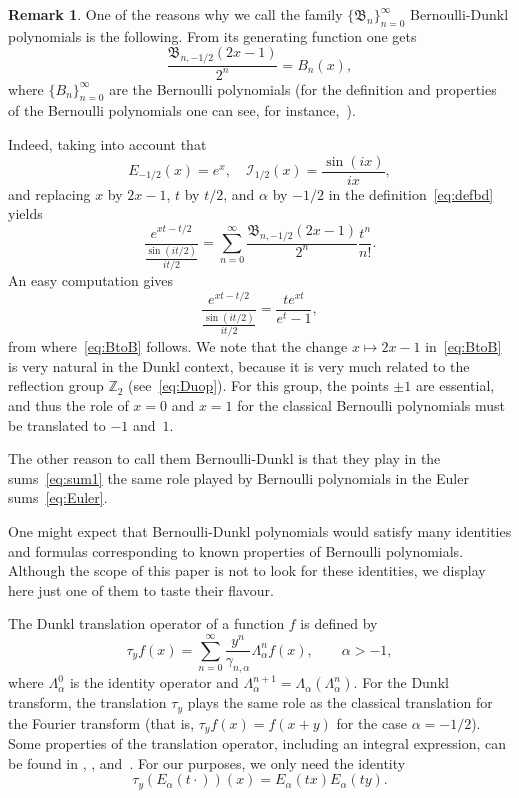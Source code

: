 \documentclass[10pt,a4paper]{article}
\theoremstyle{plain}
\theoremstyle{definition}
\newtheorem{remark}{Remark}
\numberwithin{equation}{section} %
\newcommand{\La}{\Lambda_{\alpha}}
\newcommand{\I}{\mathcal{I}}
\newcommand{\B}{\mathfrak{B}}
\newcommand{\ZZ}{\mathbb{Z}}
\newcommand{\cc}{\gamma}
\begin{document}
\begin{remark}
\label{rem1}
One of the reasons why we call the family $\{\B_n\}_{n=0}^{\infty}$ Bernoulli-Dunkl polynomials is the following.
From its generating function one gets
\begin{equation}
\label{eq:BtoB}
  \frac{\B_{n,-1/2}(2x-1)}{2^n} = B_n(x),
\end{equation}
where $\{B_n\}_{n=0}^{\infty}$ are the Bernoulli polynomials (for the definition and properties of the Bernoulli polynomials one can see, for instance,~\cite{EMOT, Dil-NIST}).

Indeed, taking into account that
\[
  E_{-1/2}(x) = e^x,\quad \I_{1/2}(x) = \frac{\sin(ix)}{ix},
\]
and replacing $x$ by $2x-1$, $t$ by $t/2$, and $\alpha$ by $-1/2$ in the definition~\eqref{eq:defbd} yields
\[
  \frac{e^{xt-t/2}}{\frac{\sin(it/2)}{it/2}}
  = \sum_{n=0}^\infty \frac{\B_{n,-1/2}(2x-1)}{2^n} \frac{t^n}{n!}.
\]
An easy computation gives
\[
  \frac{e^{xt-t/2}}{\frac{\sin(it/2)}{it/2}} = \frac{te^{xt}}{e^t-1},
\]
from where~\eqref{eq:BtoB} follows. We note that the change $x \mapsto 2x-1$ in~\eqref{eq:BtoB} is very natural in the Dunkl context, because
it is very much related to the reflection group $\ZZ_2$ (see~\eqref{eq:Duop}). For this group, the points $\pm1$ are essential, and thus the role of $x=0$ and $x=1$ for the classical Bernoulli polynomials must be translated to $-1$ and~$1$.

The other reason to call them Bernoulli-Dunkl is that they play in the sums~\eqref{eq:sum1} the same role played by Bernoulli polynomials in the Euler sums~\eqref{eq:Euler}.
\end{remark}


One might expect that Bernoulli-Dunkl polynomials would satisfy many identities and formulas corresponding to known properties of Bernoulli polynomials. Although the scope of this paper is not to look for these identities, we display here just one of them to taste their flavour.

The Dunkl translation operator of a function $f$ is defined by
\[
  \tau_y f(x) = \sum_{n=0}^\infty \frac{y^n}{\cc_{n,\alpha}}\La^{n}f(x),
  \qquad \alpha>-1,
\]
where $\La^0$ is the identity operator and $\La^{n+1} = \La(\La^n)$. For the Dunkl transform, the translation $\tau_y$ plays the same role as the classical translation for the Fourier transform (that is, $\tau_y f(x) = f(x+y)$ for the case $\alpha=-1/2$). Some properties of the translation operator, including an integral expression, can be found in \cite{Ros}, \cite{Rosler}, and~\cite{ThX}.
For our purposes, we only need the identity \cite[formula (4.2.2)]{Ros}
\[
  \tau_y(E_\alpha(t\cdot))(x) = E_\alpha(tx) E_\alpha (ty).
\]
\end{document}
